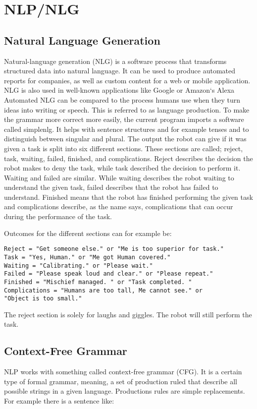 \documentclass[main.tex]{subfiles}
\begin{document}
	

	\chapter{NLP/NLG}
  
  \section{Natural Language Generation}
  Natural-language generation (NLG) is a software process that transforms structured data into natural language. It can be used to produce automated reports for companies, as well as custom content for a web or mobile application.  NLG is also used in well-known applications like Google or Amazon‘s Alexa
Automated NLG can be compared to the process humans use when they turn ideas into writing or speech. This is referred to as language production.
To make the grammar more correct more easily, the current program imports a software called simplenlg. It helps with sentence structures and for example tenses and to distinguish between singular and plural. 
The output the robot can give if it was given a task is split into six different sections. These sections are called; reject, task, waiting, failed, finished, and complications. Reject describes the decision the robot makes to deny the task, while task described the decision to perform it. Waiting and failed are similar. While waiting describes the robot waiting to understand the given task, failed describes that the robot has failed to understand. Finished means that the robot has finished performing the given task and complications describe, as the name says, complications that can occur during the performance of the task. 
\newpage

Outcomes for the different sections can for example be:
\begin{verbatim}
Reject = "Get someone else." or "Me is too superior for task."
Task = "Yes, Human." or "Me got Human covered." 
Waiting = "Calibrating." or "Please wait."
Failed = "Please speak loud and clear." or "Please repeat."
Finished = "Mischief managed. " or "Task completed. "
Complications = "Humans are too tall, Me cannot see." or
"Object is too small."
\end{verbatim}

The reject section is solely for laughs and giggles. The robot will still perform the task.
  
  \section{Context-Free Grammar}
  NLP works with something called context-free grammar (CFG). It is a certain type of formal grammar, meaning, a set of  production ruled that describe all possible strings in a given language. Productions rules are simple replacements. For example there is a sentence like:
\end{document}

